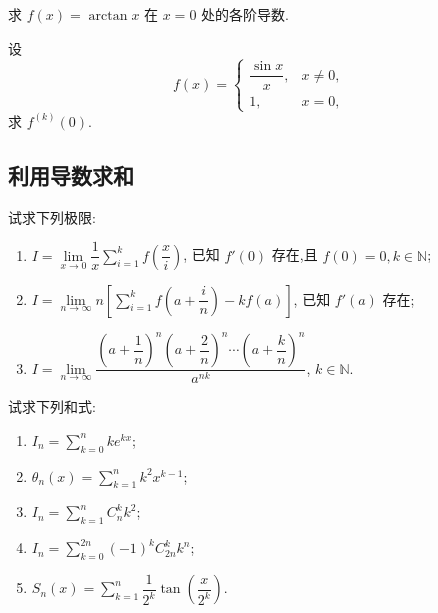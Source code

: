 \documentclass[../../数学分析培优讲义.tex]{subfiles}
\begin{document}

\begin{example}
求 $f(x)=\arctan x$ 在 $x=0$ 处的各阶导数.
\end{example}
\exampleblank

\begin{example}
设
\[
f(x)=
\begin{cases}
    \dfrac{\sin x}{x}, & x\neq0,\\
    1, & x=0,
\end{cases}
\]
求 $f^{(k)}(0)$.
\end{example}
\exampleblank



\subsection{利用导数求和}

\begin{example}
试求下列极限:
\begin{enumerate}[label=(\arabic*)]
    \item $\displaystyle
    I=\lim\limits_{x\to0}\dfrac{1}{x}\sum\limits_{i=1}^k f\left(\dfrac{x}{i}\right)$,
    已知 $f'(0)$ 存在,且 $f(0)=0,k\in\mathbb{N}$;
    \item $\displaystyle
    I=\lim\limits_{n\to\infty}n\left[\sum\limits_{i=1}^k f\left(a+\dfrac{i}{n}\right)-kf(a)\right]$,
    已知 $f'(a)$ 存在;
    \item $\displaystyle
    I=\lim\limits_{n\to\infty}
    \dfrac{\left(a+\dfrac{1}{n}\right)^n\left(a+\dfrac{2}{n}\right)^n\cdots\left(a+\dfrac{k}{n}\right)^n}{a^{nk}}$,
    $k\in\mathbb{N}$.
\end{enumerate}
\end{example}
\exampleblank

\begin{example}
试求下列和式:
\begin{enumerate}[label=(\arabic*)]
    \item $\displaystyle I_n=\sum\limits_{k=0}^n ke^{kx}$;
    \item $\displaystyle \theta_n(x)=\sum\limits_{k=1}^n k^2x^{k-1}$;
    \item $\displaystyle I_n=\sum\limits_{k=1}^n C_{n}^{k}k^2$;
    \item $\displaystyle I_n=\sum\limits_{k=0}^{2n}(-1)^k C_{2n}^{k}k^n$;
    \item $\displaystyle S_n(x)=\sum\limits_{k=1}^n\dfrac{1}{2^k}\tan\left(\dfrac{x}{2^k}\right)$.
\end{enumerate}
\end{example}
\exampleblank
\end{document}
